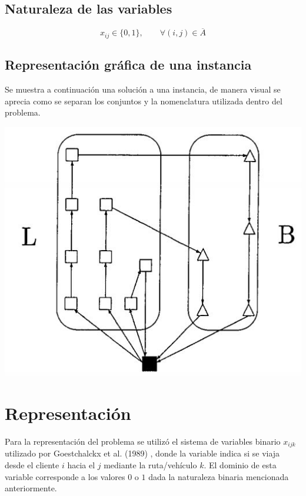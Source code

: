 \documentclass[letter, 10pt]{article}
\begin{document}
\subsection*{Naturaleza de las variables}
$$ x_{ij} \in \{0, 1\}, \qquad \forall (i, j) \in \overline{A}$$

\subsection*{Representación gráfica de una instancia}
Se muestra a continuación una solución a una instancia, de manera visual se aprecia como se separan los conjuntos y la nomenclatura utilizada dentro del problema.
\newline

\begin{center}
\includegraphics[scale=0.5]{Red.PNG}
\end{center}

\section{Representación}
Para la representación del problema se utilizó el sistema de variables binario $x_{ijk}$ utilizado por Goestchalckx et al. (1989) \cite{goetschalckx1989vehicle}, donde la variable indica si se viaja desde el cliente $i$ hacia el $j$ mediante la ruta/vehículo $k$. El dominio de esta variable corresponde a los valores $0$ o $1$ dada la naturaleza binaria mencionada anteriormente.
\end{document}
